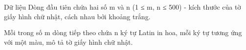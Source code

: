 Dữ liệu
Dòng đầu tiên chứa hai số m và n (1 ≤ m, n ≤ 500) - kích thước của tờ giấy hình chữ nhật, cách nhau bởi khoảng trắng.  

   Mỗi trong số m dòng tiếp theo chứa n ký tự Latin in hoa, mỗi ký tự tương ứng với một màu, mô tả tờ giấy hình chữ nhật.